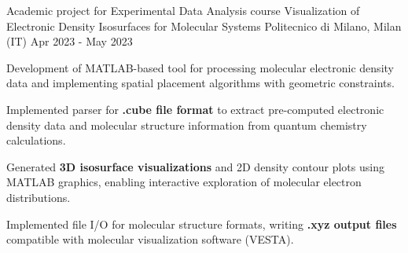 
\cventry
{Academic project for Experimental Data Analysis course}
{Visualization of Electronic Density Isosurfaces for Molecular Systems}
{Politecnico di Milano, Milan (IT)}
{Apr 2023 - May 2023}
{
    Development of MATLAB-based tool for processing molecular electronic density data and implementing spatial placement algorithms with geometric constraints.
    \newline
    \vspace{4mm}
    \begin{cvitems}
        \item {Implemented parser for \textbf{.cube file format} to extract pre-computed electronic density data and molecular structure information from quantum chemistry calculations.}
        \item {Generated \textbf{3D isosurface visualizations} and 2D density contour plots using MATLAB graphics, enabling interactive exploration of molecular electron distributions.}
        \item {Implemented file I/O for molecular structure formats, writing \textbf{.xyz output files} compatible with molecular visualization software (VESTA).}
    \end{cvitems}
}
